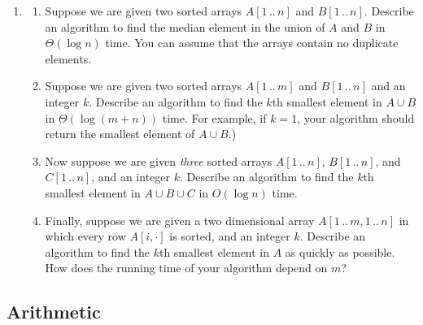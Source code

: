 \begin{exercises}
\begin{enumerate}[label=\arabic*.,ref=\thechapter.\arabic*,leftmargin=*,align=left,itemsep=1.5ex plus 0.5ex,resume]
\begin{figure}[ht]
\begin{pseudocode}
\Indent else if $k > r$\\
\Indent\Indent return $\Proc{MomomSelect}(A[r+1\,..\,n], k-r)$\\
\Indent else\\
\Indent\Indent return 
\end{pseudocode}
\caption{Selection by median of moms; see problem 20).}
\label{fig:1.23}
\end{figure}
\item
\begin{enumerate}
\item Suppose we are given two sorted arrays $A[1\,..\,n]$ and $B[1\,..\,n]$. Describe an algorithm to find the median element in the union of $A$ and $B$ in $\Theta(\log n)$ time. You can assume that the arrays contain no duplicate elements.
\item Suppose we are given two sorted arrays $A[1\,..\,m]$ and $B[1\,..\,n]$ and an integer $k$. Describe an algorithm to find the $k$th smallest element in $A \cup B$ in $\Theta(\log(m + n))$ time. For example, if $k = 1$, your algorithm should return the smallest element of $A \cup B$.) 
\item {} Now suppose we are given \emph{three} sorted arrays $A[1\,..\,n]$, $B[1\,..\,n]$, and $C[1\,..\,n]$, and an integer $k$. Describe an algorithm to find the $k$th smallest element in $A \cup B \cup C$ in $O(\log n)$ time.
\item Finally, suppose we are given a two dimensional array $A[1\,..\,m,1\,..\,n]$ in which every row $A[i, \cdot]$ is sorted, and an integer $k$. Describe an algorithm to find the $k$th smallest element in $A$ as quickly as possible. How does the running time of your algorithm depend on $m$? 
\end{enumerate}
\end{enumerate}

\subsection*{Arithmetic}


\end{exercises}
